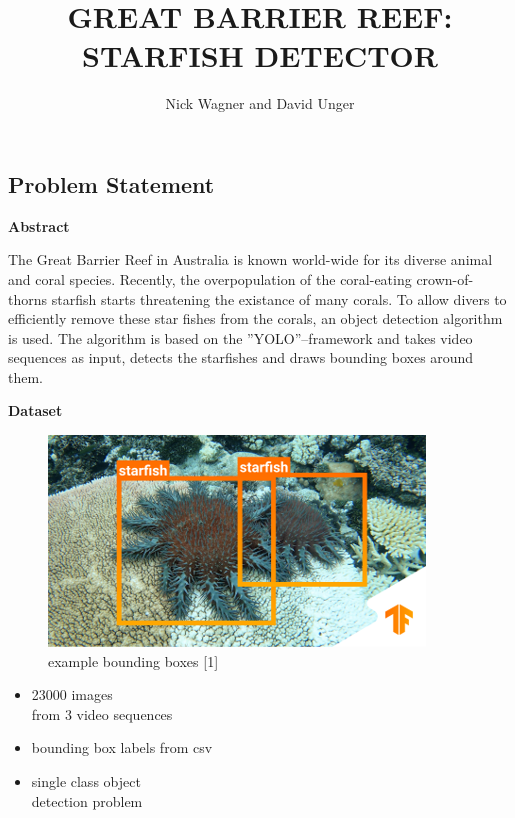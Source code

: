 \documentclass[landscape,a2,final,12pt]{issposter}
\title{\MakeUppercase{Great Barrier Reef: Starfish Detector}}
\author{Nick Wagner and David Unger}
\institute{Institute of Signal Processing and System Theory, University of Stuttgart, Germany}
\begin{document}
\maketitle

\raggedright
\raggedbottom
\raggedcolumns
\begin{multicols}{3}
\begin{samepage}
\section{Problem Statement}
    \textbf{Abstract}\\
    \begin{small} The Great Barrier Reef in Australia is known world-wide for its diverse animal and coral species.
        Recently, the overpopulation of the coral-eating crown-of-thorns starfish starts threatening the existance of many corals.
        To allow divers to efficiently remove these star fishes from the corals, an object detection algorithm is used. \newline
        The algorithm is based on the ''YOLO''--framework and takes video sequences as input, detects the starfishes and draws bounding boxes around them.\\
    \end{small}
    \vspace{0.5cm}
    \textbf{Dataset}
    \begin{figure}
    \centering
        \includegraphics[scale=0.8]{1_starfishes.png}
        \caption{example bounding boxes [1]}
    \end{figure} 
    \vspace*{-0.5cm}
    \begin{small}
    \begin{itemize}
        \item \raisebox{-0.6ex}{\~{}}23000 images\\ from 3 video sequences
        \item bounding box labels from csv
        \item single class object \\detection problem
    \end{itemize}
    \end{small}
\end{samepage}
    \columnbreak

\end{multicols}
\end{document}
